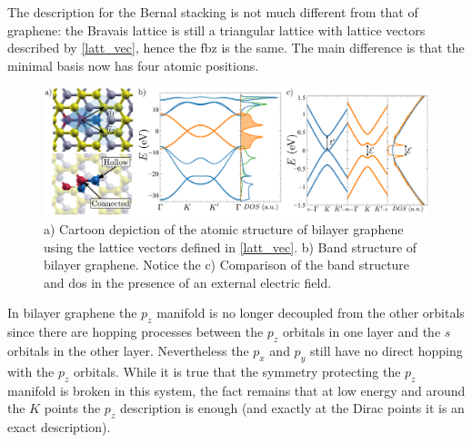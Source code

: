 The description for the Bernal stacking is not much different from that of graphene: the Bravais lattice is still a triangular lattice with lattice vectors described by \eqref{latt_vec}, hence the \ac{fbz} is the same. The main difference is that the minimal basis now has four atomic positions.
\begin{figure}[h!]
\centering
\includegraphics{graphene_bilayer/figures/graphene_bi_summary.pdf}
\vspace{-5pt}
\caption{a) Cartoon depiction of the atomic structure of bilayer graphene using the lattice vectors defined in \eqref{latt_vec}. b) Band structure of bilayer graphene. Notice the c) Comparison of the band structure and \ac{dos} in the presence of an external electric field.}
\label{Gbi_summary}
\end{figure}
\FloatBarrier
In bilayer graphene the $p_z$ manifold is no longer decoupled from the other orbitals since there are hopping processes between the $p_z$ orbitals in one layer and the $s$ orbitals in the other layer. Nevertheless the $p_x$ and $p_y$ still have no direct hopping with the $p_z$ orbitals.
While it is true that the symmetry protecting the $p_z$ manifold is broken in this system, the fact remains that at low energy and around the $K$ points the $p_z$ description is enough (and exactly at the Dirac points it is an exact description).\\

%
%



